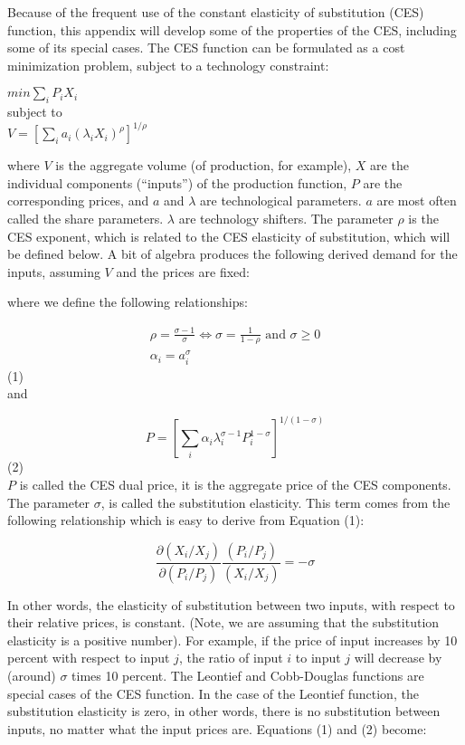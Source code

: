 \documentclass{article}
\begin{document}
Because of the frequent use of the constant elasticity of substitution (CES) function, this appendix will develop some of the properties of the CES, including some of its special cases. The CES function can be formulated as a cost minimization problem, subject to a technology constraint:

\begin{center}

$min \displaystyle \sum_i P_iX_i$\\
subject to\\
$V = \left[\displaystyle \sum_i a_i (\lambda_i X_i)^\rho \right]^{1/\rho}$

\end{center}

where $V$ is the aggregate volume (of production, for example), $X$ are the individual components (“inputs”) of the production function, $P$ are the corresponding prices, and $a$ and $\lambda$ are technological parameters. $a$ are most often called the share parameters. $\lambda$ are technology shifters. The parameter $\rho$ is the CES exponent, which is related to the CES elasticity of substitution, which will be defined below.
A bit of algebra produces the following derived demand for the inputs, assuming $V$ and the prices are fixed:

where we define the following relationships:

$$
\begin{gathered}
\rho=\frac{\sigma-1}{\sigma} \Leftrightarrow \sigma=\frac{1}{1-\rho} \text { and } \sigma \geq 0 \\
\alpha_{i}=a_{i}^{\sigma}
\end{gathered}
$$
(1)\\[15pt]
and

$$
P=\left[\sum_{i} \alpha_{i} \lambda_{i}^{\sigma-1} P_{i}^{1-\sigma}\right]^{1 /(1-\sigma)}
$$
(2)\\[15pt]
$P$ is called the CES dual price, it is the aggregate price of the CES components. The parameter $\sigma$, is called the substitution elasticity. This term comes from the following relationship which is easy to derive from Equation (1):

$$
\frac{\partial\left(X_{i} / X_{j}\right)}{\partial\left(P_{i} / P_{j}\right)} \frac{\left(P_{i} / P_{j}\right)}{\left(X_{i} / X_{j}\right)}=-\sigma
$$

In other words, the elasticity of substitution between two inputs, with respect to their relative prices, is constant. (Note, we are assuming that the substitution elasticity is a positive number). For example, if the price of input increases by 10 percent with respect to input $j$, the ratio of input $i$ to input $j$ will decrease by (around) $\sigma$ times 10 percent.
The Leontief and Cobb-Douglas functions are special cases of the CES function. In the case of the Leontief function, the substitution elasticity is zero, in other words, there is no substitution between inputs, no matter what the input prices are. Equations (1) and (2) become:
\end{document}
